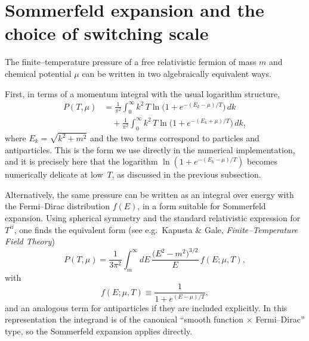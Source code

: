 \documentclass[superscriptaddress,amsmath,floatfix,aps,prc,twocolumn]{revtex4-1}
\begin{document}
\section*{Sommerfeld expansion and the choice of switching scale}

The finite--temperature pressure of a free relativistic fermion of mass $m$
and chemical potential $\mu$ can be written in two algebraically equivalent
ways.

First, in terms of a momentum integral with the usual logarithm structure,
\begin{align}
P(T,\mu)
&= \frac{1}{\pi^2}
   \int_0^\infty \! k^2\,
   T \ln\!\bigl(1 + e^{-(E_k-\mu)/T}\bigr)\, dk
\nonumber\\
&\quad + \frac{1}{\pi^2}
   \int_0^\infty \! k^2\,
   T \ln\!\bigl(1 + e^{-(E_k+\mu)/T}\bigr)\, dk,
\label{eq:P-log-form}
\end{align}
where $E_k = \sqrt{k^2+m^2}$ and the two terms correspond to particles and
antiparticles.  This is the form we use directly in the numerical
implementation, and it is precisely here that the logarithm
$\ln(1+e^{-(E_k-\mu)/T})$ becomes numerically delicate at low~$T$, as
discussed in the previous subsection.

Alternatively, the same pressure can be written as an integral over energy
with the Fermi--Dirac distribution $f(E)$, in a form suitable for
Sommerfeld expansion.  Using spherical symmetry and the standard
relativistic expression for $T^{ii}$, one finds the equivalent form
(see e.g.\ Kapusta \& Gale, \emph{Finite--Temperature Field Theory})
\begin{equation}
P(T,\mu)
 = \frac{1}{3\pi^2}\int_m^\infty dE\,
   \frac{\bigl(E^2-m^2\bigr)^{3/2}}{E}\,
   f(E;\mu,T),
\label{eq:P-FD-form}
\end{equation}
with
\begin{equation}
f(E;\mu,T) \equiv \frac{1}{1+e^{(E-\mu)/T}} ,
\end{equation}
and an analogous term for antiparticles if they are included explicitly.
In this representation the integrand is of the canonical
``smooth function $\times$ Fermi–Dirac'' type, so the Sommerfeld expansion
applies directly.

\medskip
\end{document}
